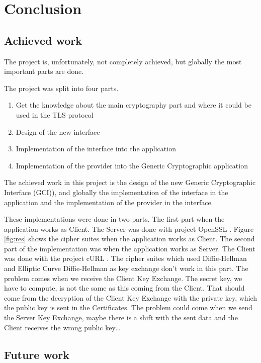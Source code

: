 ﻿\chapter{Conclusion}


\section{Achieved work}

The project is, unfortunately, not completely achieved, but globally the most
important parts are done.

The project was split into four parts.
\begin{enumerate}[noitemsep]
  \item Get the knowledge about the main cryptography part and where it could be
  used in the TLS protocol
  \item Design of the new interface
  \item Implementation of the interface into the \embtls application
  \item Implementation of the \tomcrypt provider into the Generic Cryptographic
  application
\end{enumerate}

The achieved work in this project is the design of the new Generic
Cryptographic Interface (GCI)), and globally the implementation of the interface
in the application and the implementation of the provider in the interface.

These implementations were done in two parts. The first part when the \embtls
application works as Client. The Server was done with project OpenSSL
\cite{doc:openssl}.
Figure \ref{fig:res} shows the cipher suites when the application \embtls works as
Client.
The second part of the implementation was when the \embtls application works as
Server. The Client was done with the project cURL \cite{wiki:curl}. The cipher
suites which used Diffie-Hellman and Elliptic Curve Diffie-Hellman as key exchange don't work in
this part. The problem comes when we receive the Client Key Exchange. The secret
key, we have to compute, is not the same as this coming from the Client. That
should come from the decryption of the Client Key Exchange with the private key, which
the public key is sent in the Certificates. The problem could come when we send
the Server Key Exchange, maybe there is a shift with the sent data and the
Client receives the wrong public key\ldots

\section{Future work}

